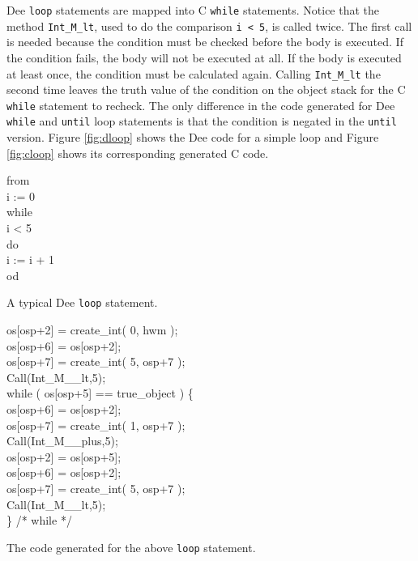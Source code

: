 Dee {\tt loop} statements are mapped into C {\tt while} statements.
Notice that the method {\tt Int\_M\_lt}, used to do the comparison
{\tt i < 5}, is called twice.  The first call is needed because the
condition must be checked before the body is executed.  If the
condition fails, the body will not be executed at all.  If the body is
executed at least once, the condition must be calculated again.
Calling {\tt Int\_M\_lt} the second time leaves the truth value of the
condition on the object stack for the C {\tt while} statement to
recheck.  The only difference in the code generated for Dee {\tt
while} and {\tt until} loop statements is that the condition is
negated in the {\tt until} version.  Figure
\ref{fig:dloop} shows the Dee code for a simple loop and Figure
\ref{fig:cloop} shows its corresponding generated C code.

\begin{shortfigure}
\begin{prog}
\>    from            \\
\>\>      i := 0      \\
\>    while           \\
\>\>      i < 5       \\
\>    do              \\
\>\>      i := i + 1  \\
\>    od
\end{prog}
\caption{A typical Dee {\tt loop} statement.}
\label{fig:dloop}
\end{shortfigure}

\begin{shortfigure}
\begin{prog}
\>    os[osp+2] = create\_int( 0, hwm );        \\
\>    os[osp+6] = os[osp+2];                    \\
\>    os[osp+7] = create\_int( 5, osp+7 );      \\
\>    Call(Int\_M\_\_lt,5);                     \\
\>    while ( os[osp+5] == true\_object )  \{   \\
\>\>    os[osp+6] = os[osp+2];                  \\
\>\>    os[osp+7] = create\_int( 1, osp+7 );    \\ 
\>\>    Call(Int\_M\_\_plus,5);                 \\
\>\>    os[osp+2] = os[osp+5];                  \\
\>\>    os[osp+6] = os[osp+2];                  \\
\>\>    os[osp+7] = create\_int( 5, osp+7 );    \\
\>\>    Call(Int\_M\_\_lt,5);                   \\
\>\>    \} /* while */
\end{prog}
\caption{The code generated for the above {\tt loop} statement.}
\label{fig:cloop}
\end{shortfigure}


